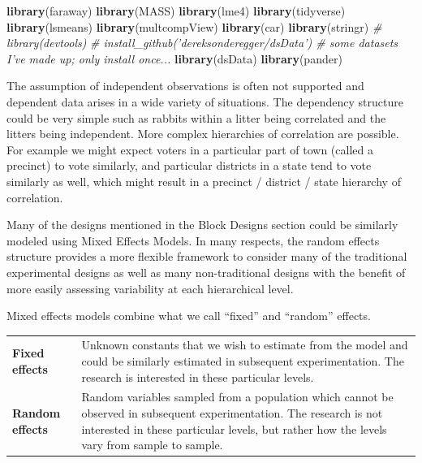 \documentclass[]{book}
\newenvironment{Shaded}{\begin{snugshade}}{\end{snugshade}}
\newcommand{\KeywordTok}[1]{\textcolor[rgb]{0.13,0.29,0.53}{\textbf{{#1}}}}
\newcommand{\CommentTok}[1]{\textcolor[rgb]{0.56,0.35,0.01}{\textit{{#1}}}}
\newcommand{\NormalTok}[1]{{#1}}
\theoremstyle{definition}
\theoremstyle{definition}
\theoremstyle{remark}
\begin{document}
\begin{Shaded}
\begin{Highlighting}[]
\KeywordTok{library}\NormalTok{(faraway)}
\KeywordTok{library}\NormalTok{(MASS)}
\KeywordTok{library}\NormalTok{(lme4)}
\KeywordTok{library}\NormalTok{(tidyverse)}
\KeywordTok{library}\NormalTok{(lsmeans)}
\KeywordTok{library}\NormalTok{(multcompView)}
\KeywordTok{library}\NormalTok{(car)}
\KeywordTok{library}\NormalTok{(stringr)}
\CommentTok{# library(devtools)}
\CommentTok{# install_github('dereksonderegger/dsData')  # some datasets I've made up; only install once...}
\KeywordTok{library}\NormalTok{(dsData)}
\KeywordTok{library}\NormalTok{(pander)}
\end{Highlighting}
\end{Shaded}

The assumption of independent observations is often not supported and
dependent data arises in a wide variety of situations. The dependency
structure could be very simple such as rabbits within a litter being
correlated and the litters being independent. More complex hierarchies
of correlation are possible. For example we might expect voters in a
particular part of town (called a precinct) to vote similarly, and
particular districts in a state tend to vote similarly as well, which
might result in a precinct / district / state hierarchy of correlation.

Many of the designs mentioned in the Block Designs section could be
similarly modeled using Mixed Effects Models. In many respects, the
random effects structure provides a more flexible framework to consider
many of the traditional experimental designs as well as many
non-traditional designs with the benefit of more easily assessing
variability at each hierarchical level.

Mixed effects models combine what we call ``fixed'' and ``random''
effects.

\begin{longtable}[]{@{}ll@{}}
\toprule
\begin{minipage}[t]{0.26\columnwidth}\raggedright\strut
\textbf{Fixed effects}\strut
\end{minipage} & \begin{minipage}[t]{0.68\columnwidth}\raggedright\strut
Unknown constants that we wish to estimate from the model and could be
similarly estimated in subsequent experimentation. The research is
interested in these particular levels.\strut
\end{minipage}\tabularnewline
\begin{minipage}[t]{0.26\columnwidth}\raggedright\strut
\textbf{Random effects}\strut
\end{minipage} & \begin{minipage}[t]{0.68\columnwidth}\raggedright\strut
Random variables sampled from a population which cannot be observed in
subsequent experimentation. The research is not interested in these
particular levels, but rather how the levels vary from sample to
sample.\strut
\end{minipage}\tabularnewline
\bottomrule
\end{longtable}
\end{document}
